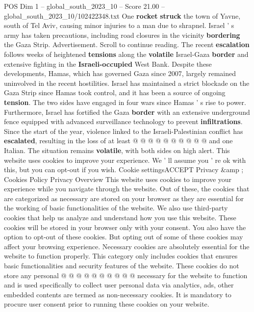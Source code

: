 \begin{textsample}{POS Dim 1 – global\_south\_2023\_10 – Score 21.00 – global\_south\_2023\_10/102422348.txt}
One \textbf{rocket} \textbf{struck} the town of Yavne, south of Tel Aviv, causing minor injuries to a man due to shrapnel.
Israel ' s army has taken precautions, including road closures in the vicinity \textbf{bordering} the Gaza Strip.
Advertisement.
Scroll to continue reading.
The recent \textbf{escalation} follows weeks of heightened \textbf{tensions} along the \textbf{volatile} Israel-Gaza \textbf{border} and extensive fighting in the \textbf{Israeli-occupied} West Bank.
Despite these developments, Hamas, which has governed Gaza since 2007, largely remained uninvolved in the recent hostilities.
Israel has maintained a strict blockade on the Gaza Strip since Hamas took control, and it has been a source of ongoing \textbf{tension}.
The two sides have engaged in four wars since Hamas ' s rise to power.
Furthermore, Israel has fortified the Gaza \textbf{border} with an extensive underground fence equipped with advanced surveillance technology to prevent \textbf{infiltrations}.
Since the start of the year, violence linked to the Israeli-Palestinian conflict has \textbf{escalated}, resulting in the loss of at least @ @ @ @ @ @ @ @ @ @ and one Italian.
The situation remains \textbf{volatile}, with both sides on high alert.
This website uses cookies to improve your experience.
We ' ll assume you ' re ok with this, but you can opt-out if you wish.
Cookie settingsACCEPT Privacy \&amp ; Cookies Policy Privacy Overview This website uses cookies to improve your experience while you navigate through the website.
Out of these, the cookies that are categorized as necessary are stored on your browser as they are essential for the working of basic functionalities of the website.
We also use third-party cookies that help us analyze and understand how you use this website.
These cookies will be stored in your browser only with your consent.
You also have the option to opt-out of these cookies.
But opting out of some of these cookies may affect your browsing experience.
Necessary cookies are absolutely essential for the website to function properly.
This category only includes cookies that ensures basic functionalities and security features of the website.
These cookies do not store any personal @ @ @ @ @ @ @ @ @ @ necessary for the website to function and is used specifically to collect user personal data via analytics, ads, other embedded contents are termed as non-necessary cookies.
It is mandatory to procure user consent prior to running these cookies on your website.

\end{textsample}
